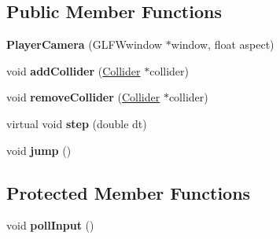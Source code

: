 \subsection*{Public Member Functions}
\begin{DoxyCompactItemize}
\item 
\hypertarget{class_player_camera_afcf71dc64aedd049567516a350f2d02e}{}{\bfseries Player\+Camera} (G\+L\+F\+Wwindow $\ast$window, float aspect)\label{class_player_camera_afcf71dc64aedd049567516a350f2d02e}

\item 
\hypertarget{class_player_camera_a525a7ad82ddb2fc7a5811064f70c128f}{}void {\bfseries add\+Collider} (\hyperlink{class_collider}{Collider} $\ast$collider)\label{class_player_camera_a525a7ad82ddb2fc7a5811064f70c128f}

\item 
\hypertarget{class_player_camera_ab6b201da5ff54012dc1a83281ce0cb47}{}void {\bfseries remove\+Collider} (\hyperlink{class_collider}{Collider} $\ast$collider)\label{class_player_camera_ab6b201da5ff54012dc1a83281ce0cb47}

\item 
\hypertarget{class_player_camera_a4b8f46b1603602471711ee4859c08ce2}{}virtual void {\bfseries step} (double dt)\label{class_player_camera_a4b8f46b1603602471711ee4859c08ce2}

\item 
\hypertarget{class_player_camera_a07e07be4973f01f696ab9cd2cc1d7fdc}{}void {\bfseries jump} ()\label{class_player_camera_a07e07be4973f01f696ab9cd2cc1d7fdc}

\end{DoxyCompactItemize}
\subsection*{Protected Member Functions}
\begin{DoxyCompactItemize}
\item 
\hypertarget{class_player_camera_abcda08bdd8dd2764e65539bdfae09131}{}void {\bfseries poll\+Input} ()\label{class_player_camera_abcda08bdd8dd2764e65539bdfae09131}

\end{DoxyCompactItemize}
